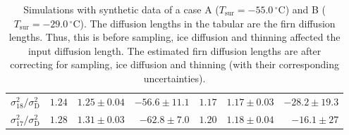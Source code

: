 \documentclass[11pt, draftcls, onecolumn]{IEEEtran} %
\numberwithin{equation}{section}
\numberwithin{table}{section}
\numberwithin{figure}{section}
\begin{document}
\begin{table}[]
\begin{tabular}{r r r r r r r }
		
		$\sigma^2_{18}/\sigma^2_\mathrm{D} $&$	1.24$& $1.25 \pm 0.04 $ 	& $-56.6 \pm 11.1$	&$1.17$	& 	$1.17 \pm 0.03$ 	& $-28.2 \pm 19.3$\\
		
		
		$\sigma^2_{17}/\sigma^2_\mathrm{D} $&$	1.28$& $ 1.31 \pm 0.03 $ 	& $  -62.8 \pm 7.0$	&$1.20$	& 	$1.18 \pm 0.04$ 	& $ -16.1 \pm 27 $\\
		\bottomrule		
	\end{tabular}
	\caption{Simulations with synthetic data of a case A ($T_{\mathrm{sur}} = -55.0 \,^{\circ} \mathrm{C}$) 
		and B ($T_{\mathrm{sur}} = -29.0 \,^{\circ} \mathrm{C}$). 
		The diffusion lengths in the tabular are the firn diffusion lengths.
		Thus, this is before sampling, ice diffusion and thinning affected the input diffusion length.
		The estimated firn diffusion lengths are after correcting for sampling, ice diffusion and thinning (with their corresponding uncertainties).  }
	\label{tbl:synthetic_diff_lens}
\end{table}





\end{document}
